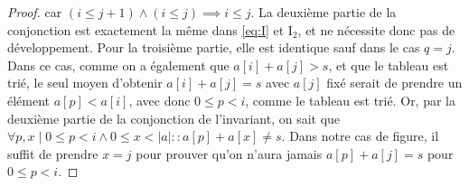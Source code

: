 \documentclass{elsarticle}
\newcommand{\abs}[1]{\left\lvert#1\right\lvert}
\begin{document}
\begin{minipage}[c]{0.65\textwidth}
\begin{proof}
car $(i \le j+1) \land (i \le j) \implies i \le j$.
La deuxième partie de la conjonction est exactement la même dans \ref{eq:I} et I$_2$,
et ne nécessite donc pas de développement.
Pour la troisième partie, elle est identique sauf dans le cas $q = j$.
Dans ce cas, comme on a également que $a[i] + a[j] > s$,
et que le tableau est trié, le seul moyen d'obtenir $a[i] + a[j] = s$ avec $a[j]$ fixé serait de prendre un élément $a[p] < a[i]$, avec donc $0 \le p < i$, comme le tableau est trié.
Or, par la deuxième partie de la conjonction de l'invariant, on sait que $\forall p, x \mid 0 \le p < i \land 0 \le x < \abs{a} :: a[p] + a[x] \ne s$.
Dans notre cas de figure, il suffit de prendre $x = j$ pour prouver qu'on n'aura jamais $a[p] + a[j] = s$ pour $0 \le p < i$.
\end{proof}
\end{minipage}
\end{document}
